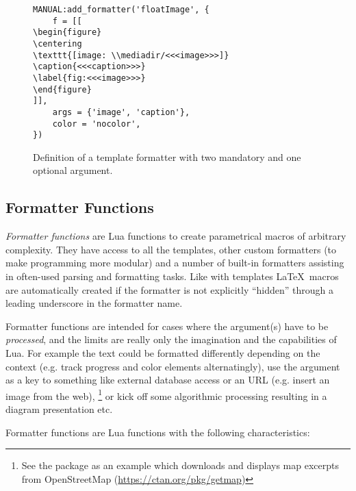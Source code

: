 \documentclass[12pt]{scrartcl}
\begin{document}
\begin{figure}
\begin{verbatim}
MANUAL:add_formatter('floatImage', {
    f = [[
\begin{figure}
\centering
\texttt{[image: \\mediadir/<<<image>>>]}
\caption{<<<caption>>>}
\label{fig:<<<image>>>}
\end{figure}
]],
    args = {'image', 'caption'},
    color = 'nocolor',
})
\end{verbatim}
\caption{Definition of a template formatter with two mandatory and one optional argument.}
\label{fig:template}
\end{figure}




\subsection{Formatter Functions}
\label{sec:usage:formatter-functions}

\emph{Formatter functions} are Lua functions to create parametrical macros of
arbitrary complexity.  They have access to all the templates, other custom
formatters (to make programming more modular) and a number of built-in
formatters assisting in often-used parsing and formatting tasks.  Like with
templates \LaTeX\ macros are automatically created if the formatter is not
explicitly “hidden” through a leading underscore in the formatter name.

Formatter functions are intended for cases where the argument(s) have to be
\emph{processed}, and the limits are really only the imagination and the
capabilities of Lua.  For example the text could be formatted differently
depending on the context (e.g. track progress and color elements alternatingly),
use the argument as a key to something like external database access or an
URL (e.g. insert an image from the web),%
\footnote{See the  package as an example which downloads and
displays map excerpts from OpenStreetMap (\url{https://ctan.org/pkg/getmap})} %
or kick off some algorithmic processing resulting in a diagram presentation etc.

\medskip

Formatter functions are Lua functions with the following characteristics:
\end{document}

